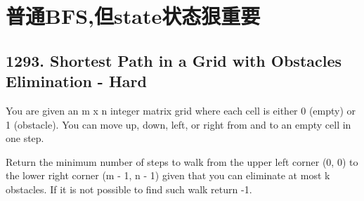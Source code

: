 \documentclass[9pt, b5paaper]{book}
\begin{document}
\section{普通BFS,但state状态狠重要}
\label{sec-1-8}
\subsection{1293. Shortest Path in a Grid with Obstacles Elimination - Hard}
\label{sec-1-8-1}
You are given an m x n integer matrix grid where each cell is either 0 (empty) or 1 (obstacle). You can move up, down, left, or right from and to an empty cell in one step.

Return the minimum number of steps to walk from the upper left corner
(0, 0) to the lower right corner (m - 1, n - 1) given that you can
eliminate at most k obstacles. If it is not possible to find such walk
return -1.
\end{document}
